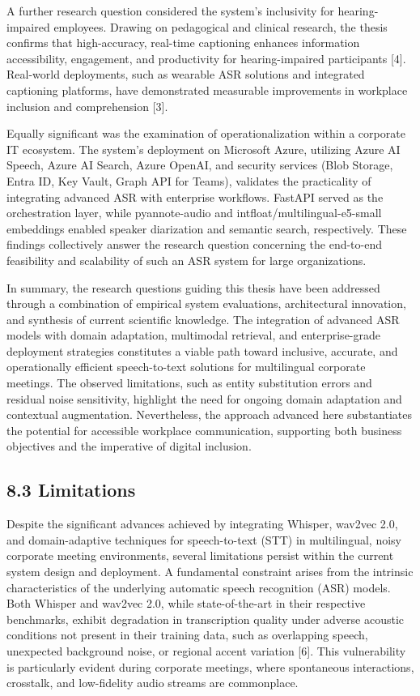 \documentclass[12pt,a4paper]{article}
\begin{document}
A further research question considered the system’s inclusivity for hearing-impaired employees. Drawing on pedagogical and clinical research, the thesis confirms that high-accuracy, real-time captioning enhances information accessibility, engagement, and productivity for hearing-impaired participants [4]. Real-world deployments, such as wearable ASR solutions and integrated captioning platforms, have demonstrated measurable improvements in workplace inclusion and comprehension [3].


Equally significant was the examination of operationalization within a corporate IT ecosystem. The system’s deployment on Microsoft Azure, utilizing Azure AI Speech, Azure AI Search, Azure OpenAI, and security services (Blob Storage, Entra ID, Key Vault, Graph API for Teams), validates the practicality of integrating advanced ASR with enterprise workflows. FastAPI served as the orchestration layer, while pyannote-audio and intfloat/multilingual-e5-small embeddings enabled speaker diarization and semantic search, respectively. These findings collectively answer the research question concerning the end-to-end feasibility and scalability of such an ASR system for large organizations.


In summary, the research questions guiding this thesis have been addressed through a combination of empirical system evaluations, architectural innovation, and synthesis of current scientific knowledge. The integration of advanced ASR models with domain adaptation, multimodal retrieval, and enterprise-grade deployment strategies constitutes a viable path toward inclusive, accurate, and operationally efficient speech-to-text solutions for multilingual corporate meetings. The observed limitations, such as entity substitution errors and residual noise sensitivity, highlight the need for ongoing domain adaptation and contextual augmentation. Nevertheless, the approach advanced here substantiates the potential for accessible workplace communication, supporting both business objectives and the imperative of digital inclusion.


\subsection{8.3 Limitations}


Despite the significant advances achieved by integrating Whisper, wav2vec 2.0, and domain-adaptive techniques for speech-to-text (STT) in multilingual, noisy corporate meeting environments, several limitations persist within the current system design and deployment. A fundamental constraint arises from the intrinsic characteristics of the underlying automatic speech recognition (ASR) models. Both Whisper and wav2vec 2.0, while state-of-the-art in their respective benchmarks, exhibit degradation in transcription quality under adverse acoustic conditions not present in their training data, such as overlapping speech, unexpected background noise, or regional accent variation [6]. This vulnerability is particularly evident during corporate meetings, where spontaneous interactions, crosstalk, and low-fidelity audio streams are commonplace.
\end{document}
